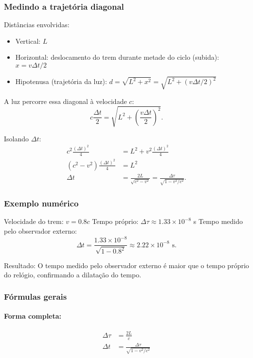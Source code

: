 \documentclass[12pt,a4paper]{article}
\begin{document}
\subsubsection*{Medindo a trajetória diagonal}

Distâncias envolvidas:
\begin{itemize}
    \item Vertical: $L$
    \item Horizontal: deslocamento do trem durante metade do ciclo (subida): $x = v \Delta t / 2$
    \item Hipotenusa (trajetória da luz): $d = \sqrt{L^2 + x^2} = \sqrt{L^2 + (v \Delta t / 2)^2}$
\end{itemize}

A luz percorre essa diagonal à velocidade $c$:
\begin{equation}
    c \frac{\Delta t}{2} = \sqrt{L^2 + \left(\frac{v \Delta t}{2}\right)^2}.
\end{equation}

Isolando $\Delta t$:
\begin{align}
    c^2 \frac{(\Delta t)^2}{4} &= L^2 + v^2 \frac{(\Delta t)^2}{4} \\
    (c^2 - v^2)\frac{(\Delta t)^2}{4} &= L^2 \\
    \Delta t &= \frac{2 L}{\sqrt{c^2 - v^2}} = \frac{\Delta \tau}{\sqrt{1 - v^2/c^2}}.
\end{align}

\subsubsection*{Exemplo numérico}

Velocidade do trem: $v = 0.8 c$  
Tempo próprio: $\Delta \tau \approx 1.33 \times 10^{-8}$ s  
Tempo medido pelo observador externo:
\begin{equation}
    \Delta t = \frac{1.33 \times 10^{-8}}{\sqrt{1 - 0.8^2}} \approx 2.22 \times 10^{-8}\text{ s}.
\end{equation}

Resultado: O tempo medido pelo observador externo é maior que o tempo próprio do relógio, confirmando a dilatação do tempo.

\subsubsection*{Fórmulas gerais}

\paragraph{Forma completa:}
\begin{align*}
\Delta \tau &= \frac{2 L}{c} \\
\Delta t &= \frac{\Delta \tau}{\sqrt{1 - v^2 / c^2}}
\end{align*}
\end{document}
